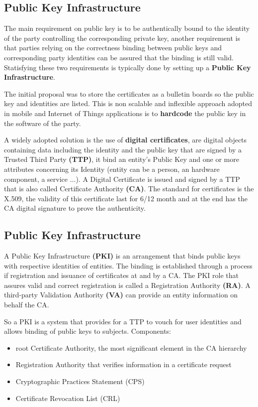     \subsection{Public Key Infrastructure}
    The main requirement on public key is to be authentically bound to the identity of the party controlling the corresponding private key, another requirement is that parties relying on the correctness binding between public keys and corresponding party identities can be assured that the binding is still valid. Statisfying these two requirements is typically done by setting up a \textbf{Public Key Infrastructure}.
    
    The initial proposal was to store the certificates as a bulletin boards so the public key and identities are listed. This is non scalable and inflexible approach adopted in mobile and Internet of Things applications is to \textbf{hardcode} the public key in the software of the party. 
    
    A widely adopted solution is the use of \textbf{digital certificates}, are digital objects containing data including the identity and the public key that are signed by a Trusted Third Party \textbf{(TTP)}, it bind an entity's Public Key and one or more attributes concerning its Identity (entity can be a person, an hardware component, a service ...). A Digital Certificate is issued and signed by a TTP that is also called Certificate Authority \textbf{(CA)}. The standard for certificates is the X.509, the validity of this certificate last for 6/12 month and at the end has the CA digital signature to prove the authenticity.
    
    \subsection{Public Key Infrastructure}
    A Public Key Infrastructure \textbf{(PKI)} is an arrangement that binds public keys with respective identities of entities. The binding is established through a process if registration and issuance of certificates at and by a CA. The PKI role that assures valid and correct registration is called a Registration Authority \textbf{(RA)}. A third-party Validation Authority \textbf{(VA)} can provide an entity information on behalf the CA.
    
    So a PKI is a system that provides for a TTP to vouch for user identities and allows binding of public keys to subjects. Components:
    \begin{itemize}
        \item root Certificate Authority, the most significant element in the CA hierarchy
        \item Registration Authority that verifies information in a certificate request
        \item Cryptographic Practices Statement (CPS)
        \item Certificate Revocation List (CRL)
    \end{itemize}
    
